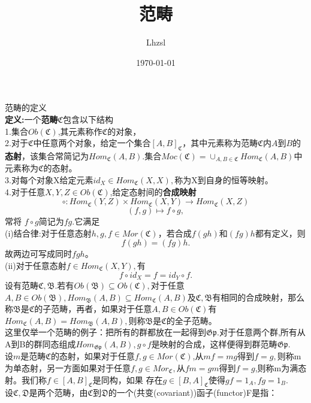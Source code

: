 \documentclass[UTF8]{article}
\title{范畴}
\author{Lhzsl}
\date{\today }
\begin{document}
	\maketitle
 范畴的定义\\
  \textbf{定义:}一个\textbf{范畴}$\mathfrak{C}$包含以下结构\\
  1.集合$Ob(\mathfrak{C})$,其元素称作$\mathfrak{C}$的对象，\\
  2.对于$\mathfrak{C}$中任意两个对象，给定一个集合$[A,B]_{\mathfrak{C}}$，其中元素称为范畴$\mathfrak{C}$内$A$到$B$的\textbf{态射}，该集合常简记为$Hom_{\mathfrak{C}}(A,B).$集合$Moc(\mathfrak{C})=\cup_{A,B\in \mathfrak{C}}Hom_{\mathfrak{C}}(A,B)$中元素称为$\mathfrak{C}$的态射。\\
  3.对每个对象X给定元素$id_{X}\in Hom_{\mathfrak{C}}(X,X),$称为X到自身的恒等映射。\\
  4.对于任意$X,Y,Z\in Ob(\mathfrak{C})$,给定态射间的\textbf{合成映射}\\
 $$ \circ:Hom_{\mathfrak{C}}(Y,Z)\times Hom_{\mathfrak{C}}(X,Y)\longrightarrow Hom_{\mathfrak{C}}(X,Z)
  $$
  $$
  (f,g)\mapsto f\circ g,
  $$
  常将 $f\circ g$简记为$fg$.它满足\\
  (i)结合律:对于任意态射$h,g,f\in Mor(\mathfrak{C})$，若合成$f(gh)$和$(fg)h$都有定义，则$$
  f(gh)=(fg)h.
  $$
  故两边可写成同时$fgh$。\\
  (ii)对于任意态射$f\in Hom_{\mathfrak{C}}(X,Y),$有$$
  f\circ id_{X}=f=id_{Y}\circ f.
  $$
  设有范畴$\mathfrak{C},\mathfrak{B}$.若有$Ob(\mathfrak{B})\subseteq Ob(\mathfrak{C}),$对于任意$A,B\in Ob(\mathfrak{B}),Hom_{\mathfrak{B}}(A,B)\subseteq Hom_{\mathfrak{C}}(A,B)$及$\mathfrak{C},\mathfrak{B}$有相同的合成映射，那么称$\mathfrak{B}$是$\mathfrak{C}$的子范畴，再者，如果对于任意$A,B\in Ob(\mathfrak{C})$有$Hom_{\mathfrak{C}}(A,B)=Hom_{\mathfrak{B}}(A,B),$则称$\mathfrak{B}$是$\mathfrak{C}$的全子范畴。\\
  这里仅举一个范畴的例子：把所有的群都放在一起得到$\mathfrak{Gp}.$对于任意两个群,所有从A到B的群同态组成$Hom_{\mathfrak{Gp}}(A,B),g\circ f$是映射的合成，这样便得到群范畴$\mathfrak{Gp}.$\\
  设$m$是范畴$\mathfrak{C}$的态射，如果对于任意$f,g\in Mor(\mathfrak{C})$,从$mf=mg$得到$f=g,$则称m为单态射，另一方面如果对于任意$f,g\in Mor_{\mathfrak{C}},$从$fm=gm$得到$f=g$,则称m为满态射。我们称$f\in [A,B]_{\mathfrak{C}}$是同构，如果 存在$g\in [B,A]_{\mathfrak{C}}$使得$gf=1_{A},fg=1_{B}.$\\
  设$\mathfrak{C},\mathfrak{D}$是两个范畴，由$\mathfrak{C}$到$\mathfrak{D}$的一个(共变(covariant))函子(functor)F是指：\\
\end{document}
